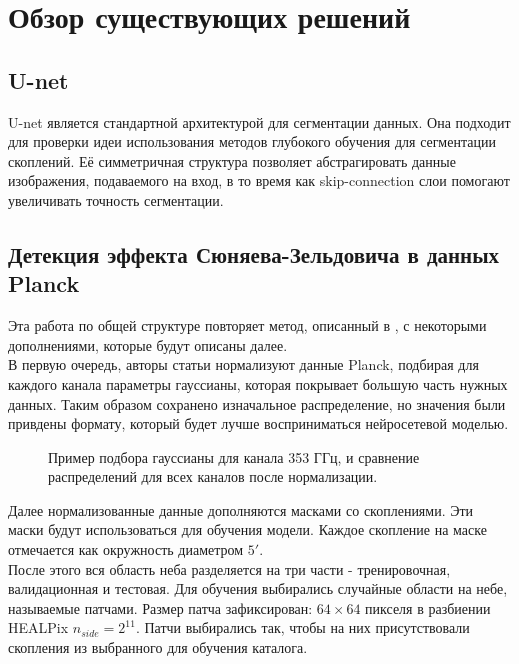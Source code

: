 \chapter{Обзор существующих решений}
\label{cha:ch_1}

\section{U-net}
U-net \cite{Unet} является стандартной архитектурой для сегментации данных. Она подходит для проверки идеи
использования методов глубокого обучения для сегментации скоплений. Её симметричная структура 
позволяет абстрагировать данные изображения, подаваемого на вход, в то время как skip-connection 
слои помогают увеличивать точность сегментации.\\

\section{Детекция эффекта Сюняева-Зельдовича в данных Planck}
Эта работа по общей структуре повторяет метод, описанный в \cite{Bonjean}, с некоторыми 
дополнениями, которые будут описаны далее.\\

В первую очередь, авторы статьи нормализуют данные Planck, подбирая для каждого канала параметры 
гауссианы, которая покрывает большую часть нужных данных. Таким образом сохранено изначальное 
распределение, но значения были привдены формату, который будет лучше восприниматься нейросетевой 
моделью.\\

\begin{figure}
    \caption{Пример подбора гауссианы для канала 353 ГГц, и сравнение распределений для всех 
        каналов после нормализации.}
\end{figure}

Далее нормализованные данные дополняются масками со скоплениями. Эти маски будут использоваться для 
обучения модели. Каждое скопление на маске отмечается как окружность диаметром $5′$.\\

После этого вся область неба разделяется на три части - тренировочная, валидационная и тестовая. 
Для обучения выбирались случайные области на небе, называемые патчами. Размер патча зафиксирован: 
$64 \times 64$ пикселя в разбиении HEALPix $n_{side}=2^{11}$. Патчи выбирались так, чтобы на них 
присутствовали скопления из выбранного для обучения каталога.\\

